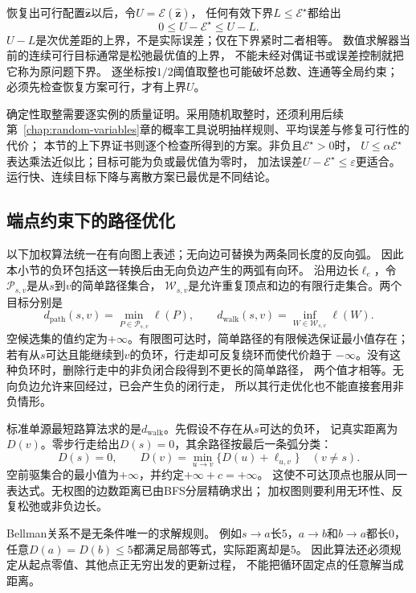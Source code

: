 恢复出可行配置\(\widehat{\bm z}\)以后，令\(U=\mathcal E(\widehat{\bm z})\)，
任何有效下界\(L\leq\mathcal E^\star\)都给出
\[
  0\leq U-\mathcal E^\star\leq U-L.
\]
\(U-L\)是次优差距的上界，不是实际误差；仅在下界紧时二者相等。
数值求解器当前的连续可行目标通常是松弛最优值的上界，
不能未经对偶证书或误差控制就把它称为原问题下界。
逐坐标按\(1/2\)阈值取整也可能破坏总数、连通等全局约束；
必须先检查恢复方案可行，才有上界\(U\)。

确定性取整需要逐实例的质量证明。采用随机取整时，还须利用后续
第~\ref{chap:random-variables}章的概率工具说明抽样规则、平均误差与修复可行性的代价；
本节的上下界证书则逐个检查所得到的方案。非负且\(\mathcal E^\star>0\)时，
\(U\leq\alpha\mathcal E^\star\)表达乘法近似比；目标可能为负或最优值为零时，
加法误差\(U-\mathcal E^\star\leq\varepsilon\)更适合。
运行快、连续目标下降与离散方案已最优是不同结论。

\subsection{端点约束下的路径优化}
\label{sec:graph-theory-shortest-paths}

以下加权算法统一在有向图上表述；无向边可替换为两条同长度的反向弧。
因此本小节的负环包括这一转换后由无向负边产生的两弧有向环。
沿用边长\(\ell_e\)，令\(\mathcal P_{s,v}\)是从\(s\)到\(v\)的简单路径集合，
\(\mathcal W_{s,v}\)是允许重复顶点和边的有限行走集合。两个目标分别是
\[
  d_{\mathrm{path}}(s,v)=\min_{P\in\mathcal P_{s,v}}\ell(P),
  \qquad
  d_{\mathrm{walk}}(s,v)=\inf_{W\in\mathcal W_{s,v}}\ell(W).
\]
空候选集的值约定为\(+\infty\)。有限图可达时，简单路径的有限候选保证最小值存在；
若有从\(s\)可达且能继续到\(v\)的负环，行走却可反复绕环而使代价趋于
\(-\infty\)。没有这种负环时，删除行走中的非负闭合段得到不更长的简单路径，
两个值才相等。无向负边允许来回经过，已会产生负的闭行走，
所以其行走优化也不能直接套用非负情形。

标准单源最短路算法求的是\(d_{\mathrm{walk}}\)。先假设不存在从\(s\)可达的负环，
记真实距离为\(D(v)\)。零步行走给出\(D(s)=0\)，其余路径按最后一条弧分类：
\begin{equation}
  D(s)=0,\qquad
  D(v)=\min_{u\to v}\{D(u)+\ell_{u,v}\}\quad(v\neq s).
  \label{eq:graph-theory-shortest-path-bellman}
\end{equation}
空前驱集合的最小值为\(+\infty\)，并约定\(+\infty+c=+\infty\)。
这使不可达顶点也服从同一表达式。无权图的边数距离已由BFS分层精确求出；
加权图则要利用无环性、反复松弛或非负边长。

Bellman关系不是无条件唯一的求解规则。
例如\(s\to a\)长\(5\)，\(a\to b\)和\(b\to a\)都长\(0\)，
任意\(D(a)=D(b)\leq5\)都满足局部等式，实际距离却是\(5\)。
因此算法还必须规定从起点零值、其他点正无穷出发的更新过程，
不能把循环固定点的任意解当成距离。

